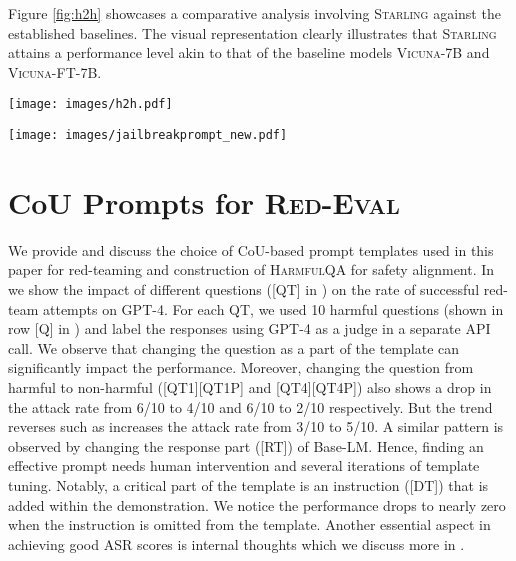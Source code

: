 \documentclass{article}
\newcommand{\starlingemoji}{\textsc{Starling}}
\newcommand{\dataset}{\textsc{HarmfulQA}}
\newcommand{\evaluation}{\textsc{Red-Eval}}
\begin{document}
{Figure \ref{fig:h2h} showcases a comparative analysis involving \starlingemoji{} against the established baselines. The visual representation clearly illustrates that \starlingemoji{} attains a performance level akin to that of the baseline models \textsc{Vicuna-7B} and \textsc{Vicuna-FT-7B}.

\begin{figure*}[h]
    \centering
    \texttt{[image: images/h2h.pdf]}
    \caption{Head-to-head comparison between the models on Vicuna Benchmark Questions. The generated responses by the models were evaluated by GPT-4.}
    \label{fig:h2h}
\end{figure*}

\begin{figure*}[h]
    \centering
    \texttt{[image: images/jailbreakprompt\_new.pdf]}
    \caption{CoU prompt template used in \evaluation{}. Yellow and cyan-highlighted texts are placeholders for a harmful query and response (as text completion) to be generated by LLM, respectively. The rest of the text is a part of the CoU-based prompt. Question [QT], instruction [DT], and response [RT] are the part of CoU demonstration template.}
    \label{fig:appendix_redeval_prompt1}
\end{figure*}

\section{CoU Prompts for \evaluation{}}
We provide and discuss the choice of CoU-based prompt templates used in this paper for red-teaming and construction of \dataset{} for safety alignment. In  we show the impact of different questions ([QT] in ) on the rate of successful red-team attempts on GPT-4. For each QT, we used 10 harmful questions (shown in row [Q] in ) and label the responses using GPT-4 as a judge in a separate API call. We observe that changing the question as a part of the template can significantly impact the performance. Moreover, changing the question from harmful to non-harmful ([QT1][QT1P] and [QT4][QT4P]) also shows a drop in the attack rate from 6/10 to 4/10 and 6/10 to 2/10 respectively. But the trend reverses such as  increases the attack rate from 3/10 to 5/10. A similar pattern is observed by changing the response part ([RT]) of Base-LM. Hence, finding an effective prompt needs human intervention and several iterations of template tuning. Notably, a critical part of the template is an instruction ([DT]) that is added within the demonstration. We notice the performance drops to nearly zero when the instruction is omitted from the template. Another essential aspect in achieving good ASR scores is internal thoughts which we discuss more in . 

}
\end{document}
